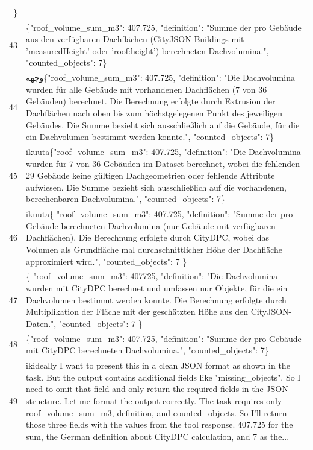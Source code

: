\documentclass[a4paper,11pt]{article}
\begin{document}
\begin{table}[ht]
\begin{tabular}{r p{12cm}}
\} \\
43 & \{"roof\_volume\_sum\_m3": 407.725, "definition": "Summe der pro Gebäude aus den verfügbaren Dachflächen (CityJSON Buildings mit 'measuredHeight' oder 'roof:height') berechneten Dachvolumina.", "counted\_objects": 7\} \\
44 &  وجهه\{"roof\_volume\_sum\_m3": 407.725, "definition": "Die Dachvolumina wurden für alle Gebäude mit vorhandenen Dachflächen (7 von 36 Gebäuden) berechnet. Die Berechnung erfolgte durch Extrusion der Dachflächen nach oben bis zum höchstgelegenen Punkt des jeweiligen Gebäudes. Die Summe bezieht sich ausschließlich auf die Gebäude, für die ein Dachvolumen bestimmt werden konnte.", "counted\_objects": 7\} \\
45 & ikuuta\{"roof\_volume\_sum\_m3": 407.725, "definition": "Die Dachvolumina wurden für 7 von 36 Gebäuden im Dataset berechnet, wobei die fehlenden 29 Gebäude keine gültigen Dachgeometrien oder fehlende Attribute aufwiesen. Die Summe bezieht sich ausschließlich auf die vorhandenen, berechenbaren Dachvolumina.", "counted\_objects": 7\} \\
46 & ikuuta\{
  "roof\_volume\_sum\_m3": 407.725,
  "definition": "Summe der pro Gebäude berechneten Dachvolumina (nur Gebäude mit verfügbaren Dachflächen). Die Berechnung erfolgte durch CityDPC, wobei das Volumen als Grundfläche mal durchschnittlicher Höhe der Dachfläche approximiert wird.",
  "counted\_objects": 7
\} \\
47 & \{
  "roof\_volume\_sum\_m3": 407725,
  "definition": "Die Dachvolumina wurden mit CityDPC berechnet und umfassen nur Objekte, für die ein Dachvolumen bestimmt werden konnte. Die Berechnung erfolgte durch Multiplikation der Fläche mit der geschätzten Höhe aus den CityJSON-Daten.",
  "counted\_objects": 7
\} \\
48 & \{"roof\_volume\_sum\_m3": 407.725, "definition": "Summe der pro Gebäude mit CityDPC berechneten Dachvolumina.", "counted\_objects": 7\} \\
49 & ikideally I want to present this in a clean JSON format as shown in the task. But the output contains additional fields like "missing\_objects". So I need to omit that field and only return the required fields in the JSON structure. Let me format the output correctly. The task requires only roof\_volume\_sum\_m3, definition, and counted\_objects. So I'll return those three fields with the values from the tool response. 407.725 for the sum, the German definition about CityDPC calculation, and 7 as the... \\

\end{tabular}
\end{table}
\end{document}
